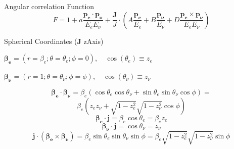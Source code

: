 \documentclass{beamer}
\begin{document}
\begin{frame}{Angular correlation Function}
	$$F = 1 + a \frac{\boldsymbol{p_e}\cdot\boldsymbol{p_\nu}}{E_eE_\nu} + \frac{\boldsymbol{J}}J\cdot\left(A \frac{\boldsymbol{p_e}}{E_e} + B \frac{\boldsymbol{p_\nu}}{E_\nu} + D \frac{\boldsymbol{p_e}\times\boldsymbol{p_\nu}}{E_eE_\nu}\right)$$
	
	
	Spherical Coordinates ($\boldsymbol{J}$ zAxis)
	
	$\boldsymbol{\beta_e} = (r=\beta_e;\theta=\theta_e;\phi=0),\quad\cos(\theta_e) \equiv z_e$
	
	$\boldsymbol{\beta_\nu} = (r=1;\theta=\theta_\nu;\phi=\phi),\quad\cos(\theta_\nu) \equiv z_\nu$
	
	
	$$\boldsymbol{\beta_e}\cdot\boldsymbol{\beta_\nu} = \beta_e(\cos\theta_e\cos\theta_\nu + \sin\theta_e\sin\theta_\nu\cos\phi) =$$
	$$ \beta_e(z_ez_\nu + \sqrt{1-z^2_e}\sqrt{1-z^2_\nu}\cos\phi)$$
	$$\boldsymbol{\beta_e}\cdot\boldsymbol{j} = \beta_e\cos\theta_e=\beta_ez_e$$
	$$\boldsymbol{\beta_\nu}\cdot\boldsymbol{j} = \cos\theta_\nu=z_\nu$$
	$$\boldsymbol{j}\cdot(\boldsymbol{\beta_e}\times\boldsymbol{\beta_\nu})=\beta_e\sin\theta_e\sin\theta_\nu\sin\phi=\beta_e\sqrt{1-z^2_e}\sqrt{1-z^2_\nu}\sin\phi$$
\end{frame}	
	
\end{document}
